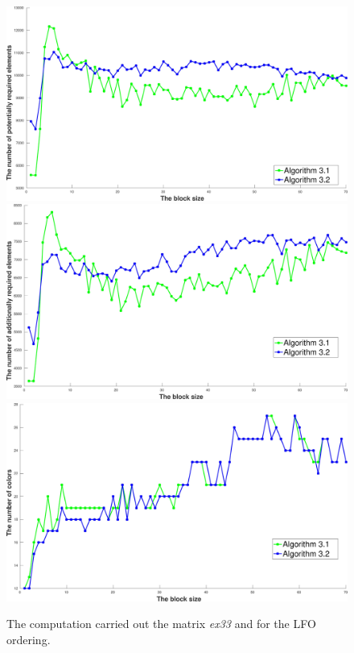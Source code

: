 \documentclass[12pt, twoside,a4paper,toc=bibliography]{scrbook}
\begin{document}
\begin{figure}
\centering
\includegraphics[width=0.75\linewidth]{ex33_alg31_alg32_bls_lfo_pot}
\includegraphics[width=0.75\linewidth]{ex33_alg31_alg32_bls_lfo_add}
\includegraphics[width=0.75\linewidth]{ex33_alg31_alg32_bls_lfo_cols}
\caption{The computation carried  out the matrix \textit{ex33} and for the LFO ordering.}
\label{ex33_alg31_alg32_bls_lfo}
\end{figure}
\end{document}
